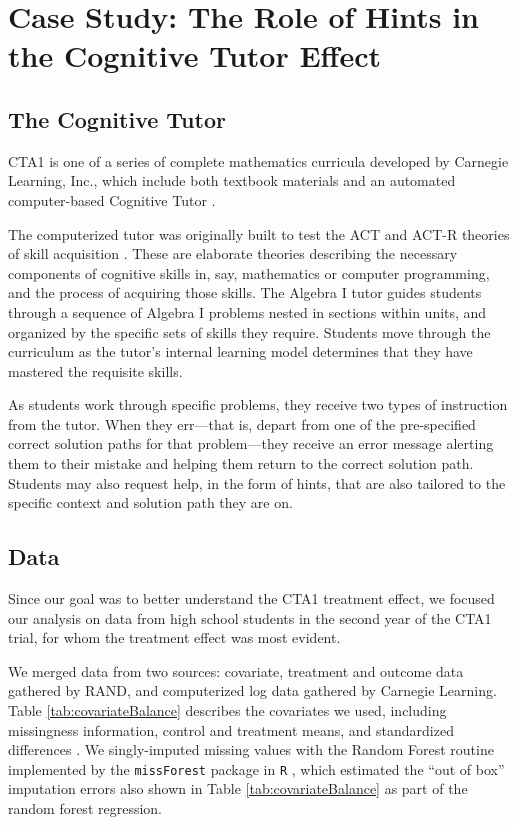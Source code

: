 \documentclass{article}\usepackage[]{graphicx}\usepackage[]{color}
\begin{document}
\section{Case Study: The Role of Hints in the Cognitive Tutor Effect}

\subsection{The Cognitive Tutor}
CTA1 is one of a series of complete mathematics curricula developed by
Carnegie Learning, Inc., which include both textbook materials and an
automated computer-based Cognitive Tutor
\citep{anderson1995cognitive,pane2014effectiveness}.

The computerized tutor was originally built to test the ACT and ACT-R
theories of skill acquisition \citep{anderson2013architecture}.
These are elaborate theories describing the necessary components of
cognitive skills in, say, mathematics or computer programming, and the
process of acquiring those skills.
The Algebra I tutor guides students through a sequence of Algebra I
problems nested in sections within units, and organized by the specific sets of skills they require.
Students move through the curriculum as the tutor's internal learning
model determines that they have mastered the requisite skills.

As students work through specific problems, they receive two types
of instruction from the tutor.
When they err---that is, depart from one of the pre-specified correct
solution paths for that problem---they receive an error message
alerting them to their mistake and helping them return to the correct
solution path.
Students may also request help, in the form of hints, that are also
tailored to the specific context and solution path they are on.

\subsection{Data}\label{sec:data}

Since our goal was to better understand the CTA1
treatment effect, we focused our analysis on data from high school students in
the second year of the CTA1 trial, for whom the treatment effect was
most evident.

We merged data from two sources: covariate, treatment and outcome data gathered by RAND, and computerized log data gathered by Carnegie Learning.
Table \ref{tab:covariateBalance} describes the covariates we used, including
missingness information, control and treatment means, and standardized
differences \citep[c.f.][]{kalton1968standardization}.
We singly-imputed missing values with the Random Forest routine implemented
by the \texttt{missForest} package in \texttt{R}
\citep{missForest,rcite},  which estimated the ``out of box'' imputation
errors also shown in Table \ref{tab:covariateBalance} as part of the random forest regression.
\end{document}
